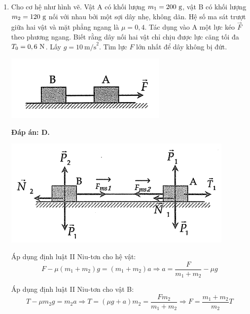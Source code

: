 \begin{enumerate}[label=\bfseries Câu \arabic*:]
{		
	}
	\item {}
	
	\cauhoi
	{Cho cơ hệ như hình vẽ. Vật A có khối lượng $m_1=200\ \text g$, vật B có khối lượng $m_2=120\ \text g$ nối với nhau bởi một sợi dây nhẹ, không dãn. Hệ số ma sát trượt giữa hai vật và mặt phẳng ngang là $\mu = 0,4$. Tác dụng vào A một lực kéo $\vec F$ theo phương ngang. Biết rằng dây nối hai vật chỉ chịu được lực căng tối đa $T_0=0,6\ \text N$. Lấy $g=10\ \text{m/s}^2$. Tìm lực $F$ lớn nhất để dây không bị đứt.
		\begin{center}
			\includegraphics[scale=0.8]{../figs/VN11-Y21-PH-SYL-007-1}
		\end{center}
	}
	
	\loigiai
	{\textbf{Đáp án: D.}
		
		\begin{center}
			\includegraphics[scale=0.8]{../figs/VN11-Y21-PH-SYL-007-2}
		\end{center}
		
		Áp dụng định luật II Niu-tơn cho hệ vật:
		\[F-\mu (m_1 + m_2)g=(m_1+m_2)a \Rightarrow a = \dfrac{F}{m_1 + m_2} - \mu g\]
		
		Áp dụng định luật II Niu-tơn cho vật B:
		\[T-\mu m_2g=m_2 a \Rightarrow T = (\mu g + a)m_2 = \dfrac{F m_2}{m_1 + m_2} \Rightarrow F = \dfrac{m_1 + m_2}{m_2}T\]
		
}
\end{enumerate}
